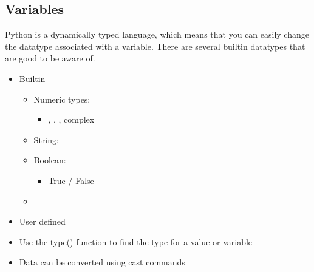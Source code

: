 \documentclass[letterpaper,10pt,english]{sphinxmanual}
\begin{document}
\subsection{Variables}
\label{\detokenize{content/Introduction_to_Programming:variables}}
Python is a dynamically typed language, which means that you can easily change the datatype associated with a variable. There are several built\sphinxhyphen{}in datatypes that are good to be aware of.
\begin{itemize}
\item {} 
Built\sphinxhyphen{}in
\begin{itemize}
\item {} 
Numeric types:
\begin{itemize}
\item {} 
, , , complex

\end{itemize}

\item {} 
String: 

\item {} 
Boolean: 
\begin{itemize}
\item {} 
True / False

\end{itemize}

\item {} 

\end{itemize}

\item {} 
User defined

\item {} 
Use the type() function to find the type for a value or variable

\item {} 
Data can be converted using cast commands

\end{itemize}
\end{document}
